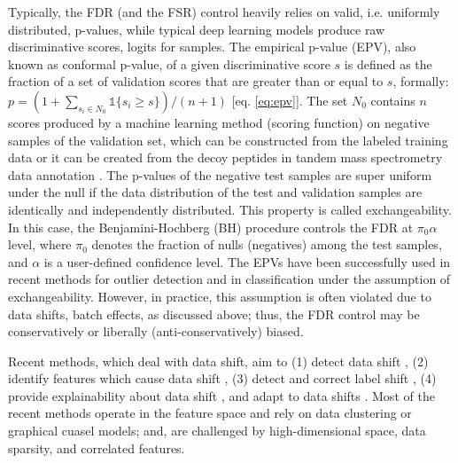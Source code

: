 \documentclass{article}
\newcommand{\mathone}{\mathds{1}}
\begin{document}
Typically, the FDR (and the FSR) control heavily relies on valid, i.e. uniformly distributed, p-values, while typical deep learning models produce raw discriminative scores, logits for samples. %
The empirical p-value (EPV), also known as conformal p-value, of a given discriminative score $s$ is defined as the fraction of a set of validation scores that are greater than or equal to $s$, formally: $p=(1+\sum_{s_i\in N_0} \mathone\{s_i \ge s\})/(n+1) \label{eq:epv}$ [eq. \ref{eq:epv}]. The set $N_0$ contains $n$ scores produced by a machine learning method (scoring function) on negative samples of the validation set, which can be constructed from the labeled training data or it can be created from the decoy peptides in tandem mass spectrometry data annotation \cite{elias2007target,danilova2019bias}. The p-values of the negative test samples are super uniform under the null if the data distribution of the test and validation samples are identically and independently distributed. This property is called exchangeability. In this case, the Benjamini-Hochberg (BH) procedure controls the FDR at $\pi_0\alpha$ level, where $\pi_0$ denotes the fraction of nulls (negatives) among the test samples, and $\alpha$ is a user-defined confidence level. The EPVs have been successfully used in recent methods for outlier detection \cite{bates2023testing,marandon2023adaptive} and in classification \cite{rava2021burden, angelopoulos2021learn} under the assumption of exchangeability.   However, in practice, this assumption is often violated due to data shifts, batch effects, as discussed above; thus, the FDR control may be conservatively or liberally (anti-conservatively) biased. 

Recent methods, which deal with data shift, aim to (1) detect data shift  \cite{ dasu2009change}, (2) identify features which cause data shift \cite{kulinski2020feature}, (3) detect and correct label shift \cite{lipton2018detecting}, (4) provide explainability about data shift \cite{budhathoki2021did,kulinski2023towards}, and adapt to data shifts \cite{sui2024unleashing, zhang2021adaptive, zhang2022memo}. Most of the recent methods operate in the feature space and rely on data clustering or graphical cuasel models; and, are challenged by high-dimensional space, data sparsity, and correlated features. 
\end{document}
